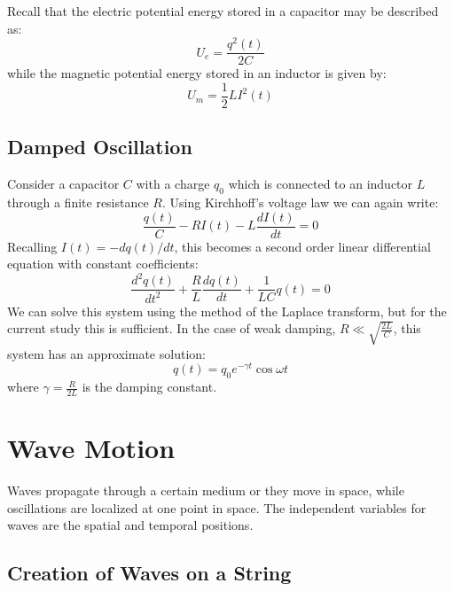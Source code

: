 \documentclass[12pt, a4paper, oneside, openright, titlepage]{book}
\begin{document}
Recall that the electric potential energy stored in a capacitor may be described as:
\begin{equation}
    U_e = \frac{q^2(t)}{2C}
\end{equation}
while the magnetic potential energy stored in an inductor is given by:
\begin{equation}
    U_m = \frac{1}{2}LI^2(t)
\end{equation}


\subsection{Damped Oscillation}

Consider a capacitor $C$ with a charge $q_0$ which is connected to an inductor $L$ through a finite resistance $R$. Using Kirchhoff's voltage law we can again write:
\begin{equation}
    \frac{q(t)}{C} - RI(t)-L\frac{dI(t)}{dt} = 0
\end{equation}
Recalling $I(t) = -dq(t)/dt$, this becomes a second order linear differential equation with constant coefficients:
\begin{equation}
    \frac{d^2q(t)}{dt^2}+\frac{R}{L}\frac{dq(t)}{dt}+\frac{1}{LC}q(t) = 0
\end{equation}
We can solve this system using the method of the Laplace transform, but for the current study this is sufficient. In the case of weak damping, $R \ll \sqrt{\frac{2L}{C}}$, this system has an approximate solution:
\begin{equation}
    q(t) = q_0e^{-\gamma t}\cos\omega t
\end{equation}
where $\gamma = \frac{R}{2L}$ is the damping constant.




\section{Wave Motion}

Waves propagate through a certain medium or they move in space, while oscillations are localized at one point in space. The independent variables for waves are the spatial and temporal positions.


\subsection{Creation of Waves on a String}
\end{document}
